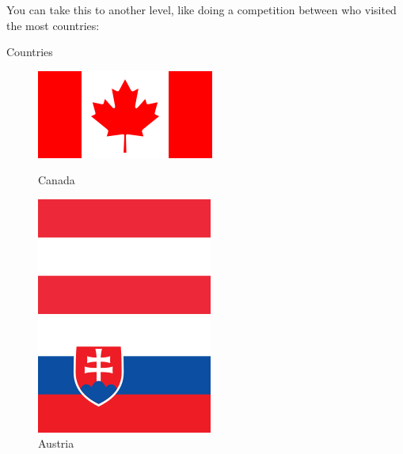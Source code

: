 You can take this to another level, like doing a
competition between who visited the most countries:


\begin{frame}{Countries}
\begin{figure}[!ht]
\centering

\begin{minipage}{.24\textwidth}
\centering
\includegraphics[width=1\linewidth]{img/countries/canada.png}
\caption{Canada}
\end{minipage}
\begin{minipage}{.24\textwidth}
\centering
\includegraphics[width=0.8\linewidth]{img/countries/austria.png}
\caption{Austria}
\end{minipage}
\begin{minipage}{.24\textwidth}
\centering
\includegraphics[width=0.8\linewidth]{img/countries/slovakia.png}

\end{minipage}
\end{figure}
\end{frame}
